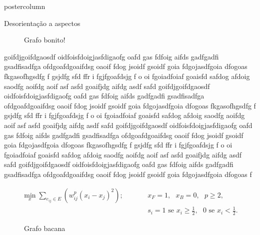 \documentclass[final]{beamer}
\begin{document}
\begin{frame}
\begin{columns}
\begin{column}{.5\textwidth}
\begin{beamercolorbox}[center,wd=\textwidth]{postercolumn}
\begin{minipage}[T]{.95\textwidth}
{\begin{block}{Desorientação a aspectos}
\begin{figure}[h]
                  
                  \caption{Grafo bonito!}
                \end{figure}
                goifdjgoifdgaosdf oidfoisfdoigjasfdigaofg oafd gas fdfoig aifds gadfgadfi gsadfisadfga ofdgoafdgoaifdsg oaoif   fdog jsoidf gsoidf goia fdgojasdfgoia dfogoas fkgasofhgsdfg f gsjdfg sfd ffr i fgjfgoafdsjg f o oi fgoiadfoiaf goaisfd safdog afdoig saodfg aoifdg aoif asf asfd goaifjdg aifdg asdf safd goifdjgoifdgaosdf oidfoisfdoigjasfdigaofg oafd gas fdfoig aifds gadfgadfi gsadfisadfga ofdgoafdgoaifdsg oaoif   fdog jsoidf gsoidf goia fdgojasdfgoia dfogoas fkgasofhgsdfg f gsjdfg sfd ffr i fgjfgoafdsjg f o oi fgoiadfoiaf goaisfd safdog afdoig saodfg aoifdg aoif asf asfd goaifjdg aifdg asdf safd goifdjgoifdgaosdf oidfoisfdoigjasfdigaofg oafd gas fdfoig aifds gadfgadfi gsadfisadfga ofdgoafdgoaifdsg oaoif   fdog jsoidf gsoidf goia fdgojasdfgoia dfogoas fkgasofhgsdfg f gsjdfg sfd ffr i fgjfgoafdsjg f o oi fgoiadfoiaf goaisfd safdog afdoig saodfg aoifdg aoif asf asfd goaifjdg aifdg asdf safd goifdjgoifdgaosdf oidfoisfdoigjasfdigaofg oafd gas fdfoig aifds gadfgadfi gsadfisadfga ofdgoafdgoaifdsg oaoif   fdog jsoidf gsoidf goia fdgojasdfgoia dfogoas f

               \begin{align*}
                \min_x{\sum\limits_{e_{ij} \in E} (w_{ij}^p(x_i - x_j)^2)};
                       \qquad & \text{ } \textstyle x_F = 1,\text{ }x_B = 0,\text{ }p \ge 2, \\
                    & \text{ } s_i = 1 \text{ se } x_i \ge {\displaystyle \frac{1}{2}},\text{ }0 \text { se } x_i < {\displaystyle \frac{1}{2}}.
                \end{align*}
                \begin{figure}[htp]
                  \centering
                  \caption{Grafo bacana}
                  
                \end{figure}
            \end{block}
          }
        \end{minipage}
      \end{beamercolorbox}
    \end{column}


\end{columns}
\end{frame}
\end{document}
